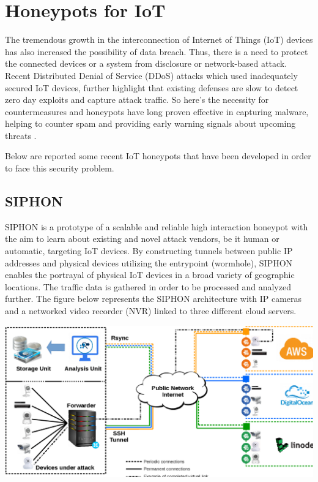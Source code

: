 \documentclass[epsfig,a4paper,11pt,titlepage,oneside,openany]{book}
\begin{document}
\chapter{Honeypots for IoT}
The tremendous growth in the interconnection of Internet of Things (IoT) devices has also increased the possibility of data breach. Thus, there is a need to protect the connected devices or a system from disclosure or network-based attack. Recent Distributed Denial of Service (DDoS) attacks which used inadequately secured IoT devices, further highlight that existing defenses are slow to detect zero day exploits and capture attack traffic. So here’s the necessity for countermeasures and honeypots have long proven effective in capturing malware, helping to counter spam and providing early warning signals about upcoming threats \cite{review}.

Below are reported some recent IoT honeypots that have been developed in order to face this security problem.

\section{SIPHON}

SIPHON is a prototype of a scalable and reliable high interaction honeypot with the aim to learn about existing and novel attack vendors, be it human or automatic, targeting IoT devices. By constructing tunnels between public IP addresses and physical devices utilizing the entrypoint (wormhole), SIPHON enables the portrayal of physical IoT devices in a broad variety of geographic locations. The traffic data is gathered in order to be processed and analyzed further. The figure below represents the SIPHON architecture with IP cameras and a networked video recorder (NVR) linked to three different cloud servers. \cite{guarnizo2017siphon}
\begin{center}
\includegraphics[scale=0.25]{SIPHON}
\end{center}
\end{document}
